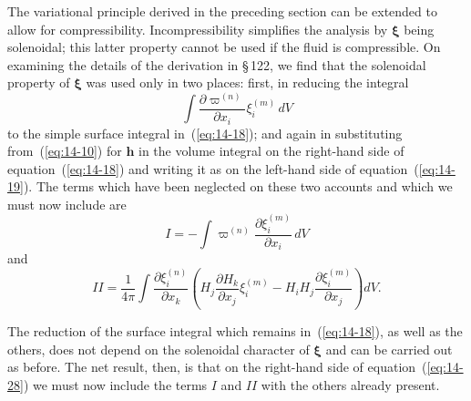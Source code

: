 The variational principle derived in the preceding section can be extended to allow for compressibility. Incompressibility simplifies the analysis by $\boldsymbol{\xi}$ being solenoidal; this latter property cannot be used if the fluid is compressible. On examining the details of the derivation in \S\,122, we find that the solenoidal property of $\boldsymbol{\xi}$ was used only in two places: first, in reducing the integral
\begin{equation}
\label{eq:14-43}
\int \frac{\partial \varpi^{(n)}}{\partial x_i} \xi_i^{(m)} \, dV
\end{equation}
to the simple surface integral in~(\ref{eq:14-18}); and again in substituting from~(\ref{eq:14-10}) for $\mathbf{h}$ in the volume integral on the right-hand side of equation~(\ref{eq:14-18}) and writing it as on the left-hand side of equation~(\ref{eq:14-19}). The terms which have been neglected on these two accounts and which we must now include are
\begin{equation}
\label{eq:14-44}
I = -\int \varpi^{(n)} \frac{\partial \xi_i^{(m)}}{\partial x_i} \, dV
\end{equation}
and
\begin{equation}
\label{eq:14-45}
\mathit{II} = \frac{1}{4\pi} \int \frac{\partial \xi_i^{(n)}}{\partial x_k} \left( H_j \frac{\partial H_k}{\partial x_j} \xi_i^{(m)} - H_i H_j \frac{\partial \xi_i^{(m)}}{\partial x_j} \right) dV.
\end{equation}

The reduction of the surface integral which remains in~(\ref{eq:14-18}), as well as the others, does not depend on the solenoidal character of $\boldsymbol{\xi}$ and can be carried out as before. The net result, then, is that on the right-hand side of equation~(\ref{eq:14-28}) we must now include the terms $I$ and $\mathit{II}$ with the others already present.

